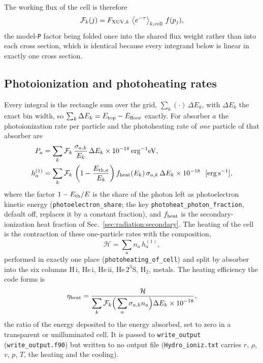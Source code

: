 The working flux of the cell is therefore
\begin{equation}
\mathcal{F}_k(j) = F_{{\rm XUV},k}\,
   \left\langle e^{-\tau}\right\rangle_{k,{\rm cell}}\, f(p_j),
\label{eq:rad:workingflux}
\end{equation}
the model-\texttt{P} factor being folded once into the shared flux weight
rather than into each cross section, which is identical because every
integrand below is linear in exactly one cross section.

\subsection{Photoionization and photoheating rates}
\label{sec:radiation:rates}

Every integral is the rectangle sum over the grid,
$\sum_k(\cdot)\,\Delta E_k$, with $\Delta E_k$ the exact bin width, so
$\sum_k \Delta E_k = E_{\rm top}-E_{\rm floor}$ exactly. For absorber $a$
the photoionization rate per particle and the photoheating rate of
\emph{one} particle of that absorber are
\begin{align}
P_a &= \sum_k \mathcal{F}_k\,\frac{\sigma_{a,k}}{E_k}\,\Delta E_k
       \times 10^{-18}\,\mathrm{erg^{-1}eV},
  \label{eq:rad:photorate}\\
h^{(1)}_a &= \sum_k \mathcal{F}_k\,
   \left(1-\frac{E_{{\rm th},a}}{E_k}\right) f_{\rm heat}(E_k)\,
   \sigma_{a,k}\,\Delta E_k \times 10^{-18}\ \ [\mathrm{erg\,s^{-1}}],
  \label{eq:rad:photoheat}
\end{align}
where the factor $1-E_{\rm th}/E$ is the share of the photon left as
photoelectron kinetic energy (\texttt{photoelectron\_share}; the key
\texttt{photoheat\_photon\_fraction}, default off, replaces it by a constant
fraction), and $f_{\rm heat}$ is the secondary-ionization heat fraction of
Sec.~\ref{sec:radiation:secondary}. The heating of the cell is the contraction
of these one-particle rates with the composition,
\begin{equation}
\mathcal{H} = \sum_a n_a\,h^{(1)}_a,
\label{eq:rad:heatcontraction}
\end{equation}
performed in exactly one place (\texttt{photoheating\_of\_cell}) and split
by absorber into the six columns H\,{\sc i}, He\,{\sc i}, He\,{\sc ii},
He\,$2^3$S, H$_2$, metals. The heating efficiency the code forms is
\begin{equation}
\eta_{\rm heat} = \frac{\mathcal{H}}{\displaystyle\sum_k \mathcal{F}_k
        \Big(\sum_a \sigma_{a,k} n_a\Big)\Delta E_k\times 10^{-18}},
\label{eq:rad:eta}
\end{equation}
the ratio of the energy deposited to the energy absorbed, set to zero in a
transparent or unilluminated cell. It is passed to \texttt{write\_output}
(\texttt{write\_output.f90}) but written to no output file
(\texttt{Hydro\_ioniz.txt} carries $r$, $\rho$, $v$, $p$, $T$, the heating
and the cooling).

